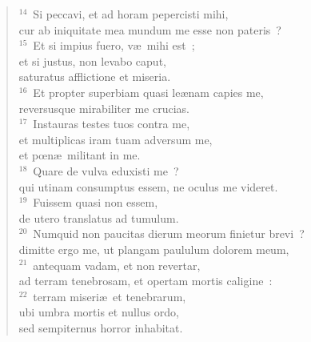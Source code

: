 \begin{flushleft}
\begin{verse}
${}^{14}$~Si peccavi, et ad horam pepercisti mihi,\\ cur ab iniquitate mea mundum me esse non pateris~?\\
${}^{15}$~Et si impius fuero, v\ae\ mihi est~;\\ et si justus, non levabo caput,\\ saturatus afflictione et miseria.\\
${}^{16}$~Et propter superbiam quasi le\ae nam capies me,\\ reversusque mirabiliter me crucias.\\
${}^{17}$~Instauras testes tuos contra me,\\ et multiplicas iram tuam adversum me,\\ et pœn\ae\ militant in me.\\
${}^{18}$~Quare de vulva eduxisti me~?\\ qui utinam consumptus essem, ne oculus me videret.\\
${}^{19}$~Fuissem quasi non essem,\\ de utero translatus ad tumulum.\\
${}^{20}$~Numquid non paucitas dierum meorum finietur brevi~?\\ dimitte ergo me, ut plangam paululum dolorem meum,\\
${}^{21}$~antequam vadam, et non revertar,\\ ad terram tenebrosam, et opertam mortis caligine~:\\
${}^{22}$~terram miseri\ae\ et tenebrarum,\\ ubi umbra mortis et nullus ordo,\\ sed sempiternus horror inhabitat.\end{verse}\end{flushleft}


